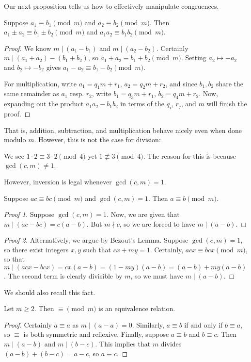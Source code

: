 \documentclass{article}
\begin{document}
Our next proposition tells us how to effectively manipulate congruences.
\begin{proposition}
Suppose $a_1\equiv b_1\pmod m$ and $a_2\equiv b_2\pmod m$. Then $a_1 \pm a_2\equiv b_1\pm b_2\pmod m$ and $a_1a_2 \equiv b_1b_2\pmod m$.
\end{proposition}
\begin{proof}
We know $m\mid (a_1 - b_1)$ and $m\mid (a_2 - b_2)$. Certainly $m\mid (a_1 + a_2) - (b_1 + b_2)$, so $a_1 + a_2 \equiv b_1 + b_2 \pmod m$. Setting $a_2 \mapsto -a_2$ and $b_2 \mapsto -b_2$ gives $a_1 - a_2 \equiv b_1 - b_2\pmod m$.

For multiplication, write $a_1 = q_1m + r_1$, $a_2 = q_2m + r_2$, and since $b_1, b_2$ share the same remainder as $a_1$ resp. $r_2$, write $b_1 = q_3m + r_1$, $b_2 = q_4m + r_2$. Now, expanding out the product $a_1 a_2 - b_1b_2$ in terms of the $q_i$, $r_j$, and $m$ will finish the proof.
\end{proof}

That is, addition, subtraction, and multiplication behave nicely even when done modulo $m$. However, this is not the case for division:

\begin{example}
We see $1\cdot 2 \equiv 3\cdot 2 \pmod 4$ yet $1\not\equiv 3\pmod 4$. The reason for this is because $\gcd(c,m) \neq 1$.
\end{example}

However, inversion is legal whenever $\gcd(c, m) = 1$.
\begin{proposition}
Suppose $ac\equiv bc \pmod m$ and $\gcd(c, m) = 1$. Then $a\equiv b\pmod m$.
\end{proposition}
\begin{proof}[Proof 1]
Suppose $\gcd(c,m) = 1$. Now, we are given that $m\mid (ac - bc) = c(a-b)$. But $m\nmid c$, so we are forced to have $m\mid (a-b)$.
\end{proof}
\begin{proof}[Proof 2]
Alternatively, we argue by Bezout's Lemma. Suppose $\gcd(c, m) = 1$, so there exist integers $x,y$ such that $cx + my = 1$. Certainly, $acx \equiv bcx\pmod m$, so that $m\mid (acx - bcx) = cx(a-b) = (1-my)(a-b) = (a-b) + my(a-b)$. The second term is clearly divisible by $m$, so we must have $m \mid (a-b)$.
\end{proof}

We should also recall this fact. \newpage

\begin{proposition}
Let $m \geq 2$. Then $\equiv \pmod m$ is an equivalence relation.
\end{proposition}
\begin{proof}
Certainly $a\equiv a$ as $m\mid (a-a) = 0$. Similarly, $a\equiv b$ if and only if $b\equiv a$, so $\equiv$ is both symmetric and reflexive. Finally, suppose $a\equiv b$ and $b\equiv c$. Then $m\mid (a-b)$ and $m\mid (b-c)$. This implies that $m$ divides $(a-b) + (b-c) = a-c$, so $a\equiv c$.
\end{proof}
\end{document}
